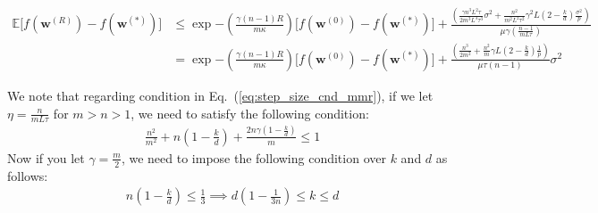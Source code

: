 \begin{align}
                \mathbb{E}\Big[f({\boldsymbol{w}}^{(R)})-f({\boldsymbol{w}}^{(*)})\Big]&\leq \exp{-\left(\frac{\gamma\left(n-1\right) R}{m\kappa}\right) }\Big[f({\boldsymbol{w}}^{(0)})-f({\boldsymbol{w}}^{(*)})\Big]+\frac{\left(\frac{\gamma n^3L^2\tau}{2m^3L^3\tau^3}\sigma^2+\frac{n^2}{m^2L^2\tau^2}\gamma^2 L\left(2-\frac{k}{d}\right)\frac{\sigma^2}{p} \right)}{\mu\gamma\left(\frac{n-1}{mL\tau}\right)}\nonumber\\
                &=\exp{-\left(\frac{\gamma\left(n-1\right) R}{m\kappa}\right) }\Big[f({\boldsymbol{w}}^{(0)})-f({\boldsymbol{w}}^{(*)})\Big]+\frac{\left(\frac{ n^3}{2m^2}+\frac{n^2}{m}\gamma L\left(2-\frac{k}{d}\right)\frac{1}{p} \right)}{\mu\tau\left(n-1\right)}\sigma^2
\end{align}

We note that regarding condition in Eq.~(\ref{eq:step_size_cnd_mmr}), if we let $\eta=\frac{n}{m L\tau}$ for $m>n>1$, we need to satisfy the following condition:
\begin{align}
    \frac{n^2}{m^2}+n\left(1-\frac{k}{d}\right)+\frac{2n\gamma\left(1-\frac{k}{d}\right)}{m}\leq 1
\end{align}
Now if you let $\gamma=\frac{m}{2}$, we need to impose the following condition over $k$ and $d$ as follows:
\begin{align}
    n\left(1-\frac{k}{d}\right)\leq \frac{1}{3}\implies d\left(1-\frac{1}{3n}\right)\leq k\leq d
\end{align}

